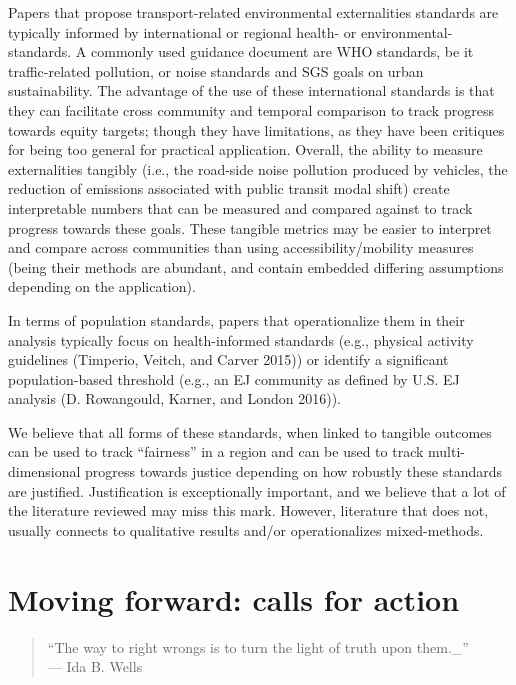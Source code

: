 \documentclass[12pt, oneside]{report}
\begin{document}
Papers that propose transport-related environmental externalities
standards are typically informed by international or regional health- or
environmental- standards. A commonly used guidance document are WHO
standards, be it traffic-related pollution, or noise standards and SGS
goals on urban sustainability. The advantage of the use of these
international standards is that they can facilitate cross community and
temporal comparison to track progress towards equity targets; though
they have limitations, as they have been critiques for being too general
for practical application. Overall, the ability to measure externalities
tangibly (i.e., the road-side noise pollution produced by vehicles, the
reduction of emissions associated with public transit modal shift)
create interpretable numbers that can be measured and compared against
to track progress towards these goals. These tangible metrics may be
easier to interpret and compare across communities than using
accessibility/mobility measures (being their methods are abundant, and
contain embedded differing assumptions depending on the application).

In terms of population standards, papers that operationalize them in
their analysis typically focus on health-informed standards (e.g.,
physical activity guidelines (Timperio, Veitch, and Carver 2015)) or
identify a significant population-based threshold (e.g., an EJ community
as defined by U.S. EJ analysis (D. Rowangould, Karner, and London
2016)).

We believe that all forms of these standards, when linked to tangible
outcomes can be used to track ``fairness'' in a region and can be used
to track multi-dimensional progress towards justice depending on how
robustly these standards are justified. Justification is exceptionally
important, and we believe that a lot of the literature reviewed may miss
this mark. However, literature that does not, usually connects to
qualitative results and/or operationalizes mixed-methods.

\hypertarget{sect6}{%
\section{Moving forward: calls for action}\label{sect6}}

\begin{quote}
``The way to right wrongs is to turn the light of truth upon them.\_''\\
--- Ida B. Wells
\end{quote}
\end{document}
